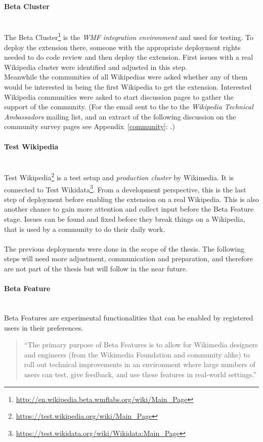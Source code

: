 \paragraph{Beta Cluster} ~\\
The Beta Cluster\footnote{\url{http://en.wikipedia.beta.wmflabs.org/wiki/Main_Page}} is the \textit{WMF integration environment} and used for testing. To deploy the extension there, someone with the appropriate deployment rights needed to do code review and then deploy the extension. First issues with a real Wikipedia cluster were identified and adjusted in this step. \\
Meanwhile the communities of all Wikipedias were asked whether any of them would be interested in being the first Wikipedia to get the extension. Interested Wikipedia communities were asked to start discussion pages to gather the support of the community. (For the email sent to the to the \textit{Wikipedia Technical Ambassadors} mailing list, and an extract of the following discussion on the community survey pages see Appendix~\ref{community}: .)

\paragraph{Test Wikipedia} ~\\
Test Wikipedia\footnote{\url{https://test.wikipedia.org/wiki/Main_Page}} is a test setup and \textit{production cluster} by Wikimedia. It is connected to Test Wikidata\footnote{\url{https://test.wikidata.org/wiki/Wikidata:Main_Page}}. From a development perspective, this is the last step of deployment before enabling the extension on a real Wikipedia. This is also another chance to gain more attention and collect input before the Beta Feature stage. Issues can be found and fixed before they break things on a Wikipedia, that is used by a community to do their daily work. \\
\\
The previous deployments were done in the scope of the thesis. The following steps will need more adjustment, communication and preparation, and therefore are not part of the thesis but will follow in the near future. 

\paragraph{Beta Feature} ~\\
Beta Features are experimental functionalities that can be enabled by registered users in their preferences. 
\begin{quotation}
``The primary purpose of Beta Features is to allow for Wikimedia designers and engineers (from the Wikimedia Foundation and community alike) to roll out technical improvements in an environment where large numbers of users can test, give feedback, and use these features in real-world settings.'' \citep{wiki:04}
\end{quotation} 

